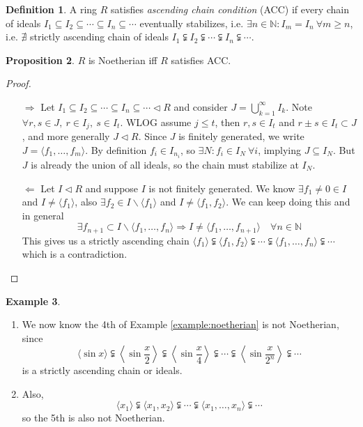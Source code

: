 \documentclass[a4paper]{article}
\newcommand{\la}{\langle}
\newcommand{\ra}{\rangle}
\theoremstyle{definition}
\newtheorem{defn}{Definition}[subsection]
\newtheorem{prop}[defn]{Proposition}
\newtheorem{example}[defn]{Example}
\begin{document}
\begin{defn}
A ring $R$ satisfies \textit{ascending chain condition} (ACC) if every chain of ideals $I_1\subseteq I_2\subseteq \cdots \subseteq I_n\subseteq \cdots$ eventually stabilizes, i.e. $\exists n\in\mathbb N:I_m=I_n \ \forall m\geq n$, i.e. $\nexists$ strictly ascending chain of ideals $I_1\subsetneqq I_2\subsetneqq \cdots \subsetneqq I_n \subsetneqq \cdots$.
\end{defn}
\begin{prop}
$R$ is Noetherian iff $R$ satisfies ACC.
\end{prop}
\begin{proof}
\begin{itemize}
\item[$\Rightarrow$] Let $I_1\subseteq I_2\subseteq \cdots \subseteq I_n\subseteq \cdots \lhd R$ and consider $J=\bigcup_{k=1}^\infty I_k$. Note $\forall r,s\in J,\ r\in I_j,\ s\in I_t$. WLOG assume $j\leq t$, then $r,s\in I_t$ and $r\pm s\in I_t\subset J$, and more generally $J\lhd R$. Since $J$ is finitely generated, we write $J=\la f_1,\ldots,f_m\ra$. By definition $f_i\in I_{n_i}$, so $\exists N:f_i\in I_N \ \forall i$, implying $J\subseteq I_N$. But $J$ is already the union of all ideals, so the chain must stabilize at $I_N$.

\item[$\Leftarrow$] Let $I\lhd R$ and suppose $I$ is not finitely generated. We know $\exists f_1\neq 0\in I$ and $I\neq \la f_1\ra$, also $\exists f_2\in I\backslash \la f_1\ra$ and $I\neq \la f_1,f_2\ra$. We can keep doing this and in general
\[
\exists f_{n+1}\subset I\backslash \la f_1,\ldots,f_n\ra \Rightarrow I\neq \la f_1,\ldots,f_{n+1}\ra \quad \forall n\in \mathbb N
\]
This gives us a strictly ascending chain $\la f_1\ra \subsetneqq \la f_1,f_2\ra \subsetneqq \cdots \subsetneqq \la f_1,\ldots,f_n\ra \subsetneqq \cdots$ which is a contradiction.
\end{itemize}
\end{proof}
\begin{example}
\begin{enumerate}
\item We now know the 4th of Example \ref{example:noetherian} is not Noetherian, since
\[
\la \sin x\ra \subsetneqq \left\la \sin \frac{x}{2}\right\ra \subsetneqq \left\la \sin \frac{x}{4}\right\ra \subsetneqq \cdots \subsetneqq \left\la \sin \frac{x}{2^n}\right\ra \subsetneqq \cdots
\]
is a strictly ascending chain or ideals.
\item Also,
\[
\la x_1\ra \subsetneqq \la x_1,x_2\ra \subsetneqq \cdots\subsetneqq \la x_1,\ldots,x_n\ra \subsetneqq \cdots
\]
so the 5th is also not Noetherian.
\end{enumerate}
\end{example}
\end{document}
